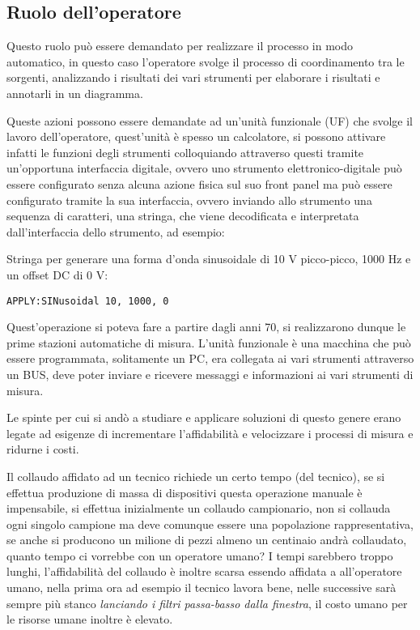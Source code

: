 \subsection{Ruolo dell'operatore}
Questo ruolo può essere demandato per realizzare il processo in modo automatico,
in questo caso l'operatore
svolge il processo di coordinamento tra le sorgenti, analizzando i risultati dei
vari strumenti per
elaborare i risultati e annotarli in un diagramma.

Queste azioni possono essere demandate ad un'unità funzionale (UF) che svolge il
lavoro
dell'operatore, quest'unità è spesso un calcolatore, si possono attivare infatti
le funzioni degli
strumenti colloquiando attraverso questi tramite un'opportuna interfaccia
digitale, ovvero uno
strumento elettronico-digitale può essere configurato senza alcuna azione fisica
sul suo front
panel ma può essere configurato tramite la sua interfaccia, ovvero inviando allo
strumento una
sequenza di caratteri, una stringa, che viene decodificata e interpretata
dall'interfaccia dello
strumento, ad esempio:

Stringa per generare una forma d'onda sinusoidale di 10 V picco-picco, 1000 Hz
e un offset DC di 0 V:

\noindent
\verb|APPLY:SINusoidal 10, 1000, 0|

Quest'operazione si poteva fare a partire dagli anni 70, si realizzarono dunque
le prime stazioni
automatiche di misura.
L'unità funzionale è una macchina che può essere programmata, solitamente un PC,
era collegata ai
vari strumenti attraverso un BUS, deve poter inviare e ricevere messaggi e
informazioni ai vari
strumenti di misura.

Le spinte per cui si andò a studiare e applicare soluzioni di questo genere
erano legate ad
esigenze di incrementare l'affidabilità e velocizzare i processi di misura e
ridurne i costi.

Il collaudo affidato ad un tecnico richiede un certo tempo (del tecnico), se si
effettua produzione
di massa di dispositivi questa operazione manuale è impensabile, si effettua
inizialmente un
collaudo campionario, non si collauda ogni singolo campione ma deve comunque
essere una popolazione
rappresentativa, se anche si producono un milione di pezzi almeno un centinaio
andrà
collaudato, quanto tempo ci vorrebbe con un operatore umano? I tempi sarebbero
troppo lunghi,
l'affidabilità del collaudo è inoltre scarsa essendo affidata a all'operatore
umano, nella prima
ora ad esempio il tecnico lavora bene, nelle successive sarà sempre più stanco
\textit{lanciando i filtri
passa-basso dalla finestra}, il costo umano per le risorse umane inoltre è
elevato.

